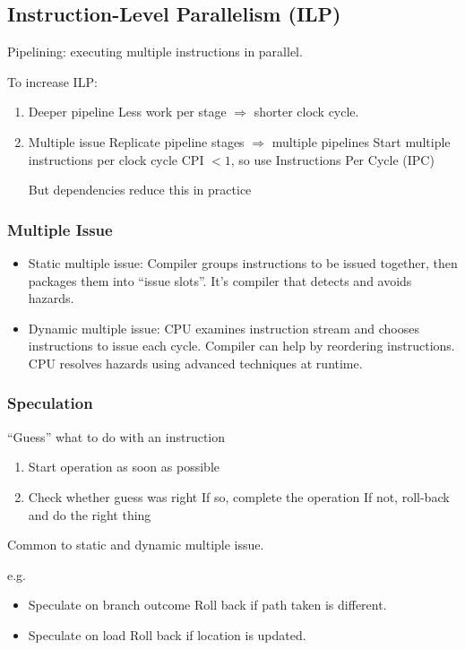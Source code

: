 \subsection{Instruction-Level Parallelism (ILP)}
Pipelining: executing multiple instructions in parallel. 

To increase ILP:
\begin{enumerate}\small
    \item Deeper pipeline
    \subitem Less work per stage $\Rightarrow$ shorter clock cycle. 
    \item Multiple issue
    \subitem Replicate pipeline stages $\Rightarrow$ multiple pipelines
    \subitem Start multiple instructions per clock cycle
    \subitem CPI $< 1$, so use Instructions Per Cycle (IPC)

    But dependencies reduce this in practice
\end{enumerate}

\subsubsection{Multiple Issue}
\begin{itemize}
    \item Static multiple issue: Compiler groups instructions to be issued together, then packages them into ``issue slots''. It's compiler that detects and avoids hazards. 
    \item Dynamic multiple issue: CPU examines instruction stream and chooses instructions to issue each cycle. Compiler can help by reordering instructions. CPU resolves hazards using advanced techniques at runtime. 
\end{itemize}

\subsubsection{Speculation}
``Guess'' what to do with an instruction
\begin{enumerate}\small
    \item Start operation as soon as possible
    \item Check whether guess was right
    \subitem If so, complete the operation
    \subitem If not, roll-back and do the right thing
\end{enumerate}

Common to static and dynamic multiple issue. 

e.g. 
\begin{itemize}\small
    \item Speculate on branch outcome
    \subitem Roll back if path taken is different. 
    \item Speculate on load
    \subitem  Roll back if location is updated. 
\end{itemize}

